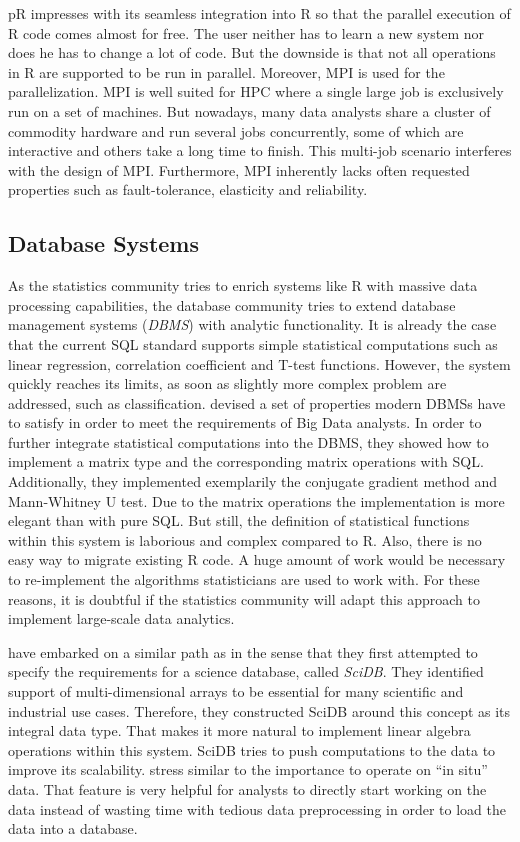 pR impresses with its seamless integration into R so that the parallel execution of R code comes almost for free.
The user neither has to learn a new system nor does he has to change a lot of code.
But the downside is that not all operations in R are supported to be run in parallel.
Moreover, MPI is used for the parallelization.
MPI is well suited for HPC where a single large job is exclusively run on a set of machines.
But nowadays, many data analysts share a cluster of commodity hardware and run several jobs concurrently, some of which are interactive and others take a long time to finish.
This multi-job scenario interferes with the design of MPI.
Furthermore, MPI inherently lacks often requested properties such as fault-tolerance, elasticity and reliability.

\subsection{Database Systems}

As the statistics community tries to enrich systems like R with massive data processing capabilities, the database community tries to extend database management systems (\emph{DBMS}) with analytic functionality.
It is already the case that the current SQL standard supports simple statistical computations such as linear regression, correlation coefficient and T-test functions.
However, the system quickly reaches its limits, as soon as slightly more complex problem are addressed, such as classification.
\cite{cohen:pve2009a} devised a set of properties modern DBMSs have to satisfy in order to meet the requirements of Big Data analysts.
In order to further integrate statistical computations into the DBMS, they showed how to implement a matrix type and the corresponding matrix operations with SQL.
Additionally, they implemented exemplarily the conjugate gradient method and Mann-Whitney U test.
Due to the matrix operations the implementation is more elegant than with pure SQL.
But still, the definition of statistical functions within this system is laborious and complex compared to R.
Also, there is no easy way to migrate existing R code.
A huge amount of work would be necessary to re-implement the algorithms statisticians are used to work with.
For these reasons, it is doubtful if the statistics community will adapt this approach to implement large-scale data analytics.

\cite{stonebraker:2009a} have embarked on a similar path as \cite{cohen:pve2009a} in the sense that they first attempted to specify the requirements for a science database, called \emph{SciDB}.
They identified support of multi-dimensional arrays to be essential for many scientific and industrial use cases.
Therefore, they constructed SciDB around this concept as its integral data type.
That makes it more natural to implement linear algebra operations within this system.
SciDB tries to push computations to the data to improve its scalability.
\cite{stonebraker:2009a} stress similar to \cite{cohen:pve2009a} the importance to operate on ``in situ'' data.
That feature is very helpful for analysts to directly start working on the data instead of wasting time with tedious data preprocessing in order to load the data into a database.

